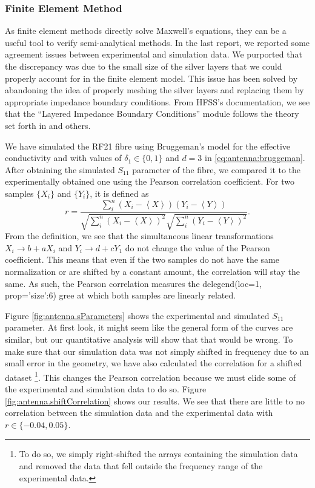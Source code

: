 \subsubsection{Finite Element Method}
As finite element methods directly solve Maxwell's equations, 
they can be a useful tool to verify semi-analytical methods. 
In the last report, we reported some agreement issues 
between experimental and simulation data. We purported
that the discrepancy was due to the small size of the
silver layers that we could properly account for in 
the finite element model. This issue has been solved
by abandoning the idea of properly meshing the silver layers
and replacing them by appropriate impedance boundary conditions.
From HFSS's documentation, we see that the ``Layered Impedance 
Boundary Conditions'' module follows the theory set forth in 
\cite{MIT1968} and others. 

We have simulated the RF21 fibre using Bruggeman's model
for the effective conductivity and with values
of $\delta_1\in\{0,1\}$ and $d=3$ in \eqref{eq:antenna:bruggeman}.
After obtaining the simulated $S_\text{11}$ parameter of the fibre,
we compared it to the experimentally obtained one using the Pearson
correlation coefficient. For two samples $\{X_i\}$ and 
$\{Y_i\}$, it is defined as
  \begin{equation}
    r = \frac{\sum_i^n\left(X_i-\left\langle X\right\rangle\right)\left(Y_i-\left\langle Y\right\rangle\right)}
	     {\sqrt{\sum_i^n\left(X_i-\left\langle X\right\rangle\right)^2}\sqrt{\sum_i^n\left(Y_i-\left\langle Y\right\rangle\right)^2}}.
  \end{equation}
From the definition, we see that the simultaneous linear transformations $X_i\rightarrow b+aX_i$ and $Y_i\rightarrow d+cY_1$
do not change the value of the Pearson coefficient. This means that even if the two samples
do not have the same normalization or are shifted by a constant amount, the correlation 
will stay the same. As such, the Pearson correlation measures the delegend(loc=1, prop={'size':6})
gree at which 
both samples are linearly related. 

Figure \ref{fig:antenna.sParameters} shows the experimental and simulated
$S_{11}$ parameter. At first look, it might seem like the general form 
of the curves are similar, but our quantitative analysis will show 
that that would be wrong. To make sure that our simulation data was not simply
shifted in frequency due to an small error in the geometry, we have
also calculated the correlation for a shifted dataset 
\footnote{To do so, we simply right-shifted the arrays containing
the simulation data and removed the data that fell outside the frequency range 
of the experimental data.}. This changes
the Pearson correlation because we must elide some of the experimental
and simulation data to do so. Figure \ref{fig:antenna.shiftCorrelation}
shows our results. We see that there are little to no correlation
between the simulation data and the experimental data with $r\in\{-0.04,0.05\}$. 

